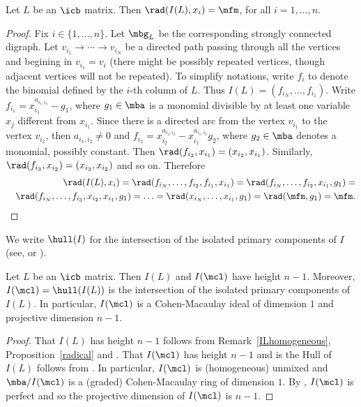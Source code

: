 \begin{proposition}\label{radical}
Let $L$ be an $\icb$ matrix. Then $\rad(I(L),x_{i})=\mfm$, for all
$i=1,\ldots ,n$.
\end{proposition}
\begin{proof}
Fix $i\in\{1,\ldots ,n\}$. Let $\mbg_L$ be the corresponding strongly
connected digraph. Let $v_{i_1}\to\cdots\to v_{i_N}$ be a directed
path passing through all the vertices and begining in $v_{i_1}=v_i$
(there might be possibly repeated vertices, though adjacent vertices
will not be repeated). To simplify notations, write $f_i$ to denote
the binomial defined by the $i$-th column of $L$. Thus
$I(L)=(f_{i_N},\ldots ,f_{i_1})$. Write
$f_{i_1}=x_{i_1}^{a_{i_1,i_1}}-g_1$, where $g_1\in \mba$ is a monomial
divisible by at least one variable $x_j$ different from $x_{i_1}$.
Since there is a directed arc from the vertex $v_{i_1}$ to the vertex
$v_{i_2}$, then $a_{i_1,i_2}\neq 0$ and
$f_{i_2}=x_{i_2}^{a_{i_2,i_2}}-x_{i_1}^{a_{i_1,i_2}}g_2$, where
$g_2\in \mba$ denotes a monomial, possibly constant. Then
$\rad(f_{i_2},x_{i_1})=(x_{i_2},x_{i_1})$.  Similarly,
$\rad(f_{i_3},x_{i_2})=(x_{i_3},x_{i_2})$ and so on. Therefore
\begin{eqnarray*}
&&\rad(I(L),x_{i})=\rad(f_{i_N},\ldots
  ,f_{i_2},f_{i_1},x_{i_1})=\rad(f_{i_N},\ldots
  ,f_{i_2},x_{i_1},g_1)=\\ &&\rad(f_{i_N},\ldots
  ,f_{i_3},x_{i_2},x_{i_1},g_1)=\ldots =\rad(x_{i_N},\ldots
  ,x_{i_1},g_1)=\rad(\mfm,g_1)=\mfm.
\end{eqnarray*}
\end{proof}

We write $\hull(I)$ for the intersection of the isolated primary
components of $I$ (see, \eg \cite{op} or \cite{opv}).

\begin{corollary}\label{projdim}
Let $L$ be an $\icb$ matrix. Then $I(L)$ and $I(\mcl)$ have height
$n-1$. Moreover, $I(\mcl)=\hull(I(L))$ is the intersection of the
isolated primary components of $I(L)$. In particular, $I(\mcl)$ is a
Cohen-Macaulay ideal of dimension $1$ and projective dimension $n-1$.
\end{corollary}
\begin{proof}
That $I(L)$ has height $n-1$ follows from Remark~\ref{ILhomogeneous},
Proposition~\ref{radical} and \cite[Lemma~5.1]{opv}. That $I(\mcl)$
has height $n-1$ and is the Hull of $I(L)$ follows from
\cite[Proposition~5.7]{opv}. In particular, $I(\mcl)$ is (homogeneous)
unmixed and $\mba/I(\mcl)$ is a (graded) Cohen-Macaulay ring of dimension
$1$. By \cite[Corollary~2.2.15]{bh}, $I(\mcl)$ is perfect and so the
projective dimension of $I(\mcl)$ is $n-1$.
\end{proof}

